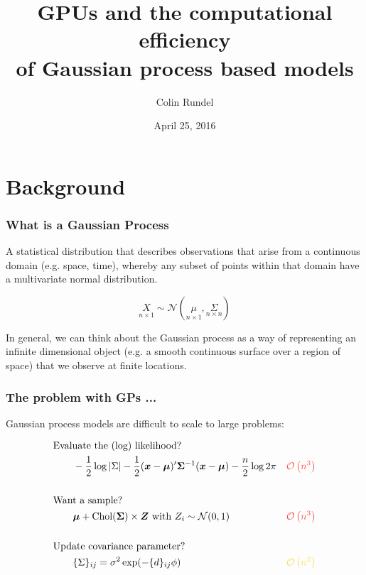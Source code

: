 \documentclass[t]{beamer}\usepackage[]{graphicx}\usepackage[]{color}
\title[GPU GPs]{GPUs and the computational efficiency\\ of Gaussian process based models}
\author{Colin Rundel}
\date{April 25, 2016}
\institute[Duke]{Duke University}
\begin{document}
\begin{frame}[plain]
\titlepage
\end{frame}




\section{Background}
\addtocounter{framenumber}{-1} 


\begin{frame}
\frametitle{What is a Gaussian Process}

A statistical distribution that describes observations that arise from a continuous domain (e.g. space, time), whereby any subset of points within that domain have a multivariate normal distribution.

\[\underset{n \times 1}{X} \sim \mathcal{N}(\underset{n \times 1}{\mu}, \underset{n \times n}{\Sigma})\]

In general, we can think about the Gaussian process as a way of representing an infinite dimensional object (e.g. a smooth continuous surface over a region of space) that we observe at finite locations.

\end{frame}


\begin{frame}
\frametitle{The problem with GPs ...}

Gaussian process models are difficult to scale to large problems:

\begin{align*}
&\text{Evaluate the (log) likelihood?}\\
%
&\qquad -\frac{1}{2} \log |\Sigma| - \frac{1}{2} (\bm{x}-\bm{\mu})' \bm{\Sigma}^{-1} (\bm{x}-\bm{\mu}) - \frac{n}{2}\log 2\pi
&\color{redhl}{\mathcal{O}\left(n^3\right)}\\
\\
&\text{Want a sample?}\\
%
&\qquad \bm{\mu} + \text{Chol}(\bm{\Sigma}) \times \bm{Z} \text{ with } Z_i \sim \mathcal{N}(0,1) 
&\color{redhl}{\mathcal{O}\left(n^3\right)} \\
\\
&\text{Update covariance parameter?} \\
%
&\qquad \{\Sigma\}_{ij} = \sigma^2 \exp(-\{d\}_{ij}\phi) 
&\color{yellowhl}{\mathcal{O}\left(n^2\right)}
\end{align*}
%


\end{frame}
\end{document}
